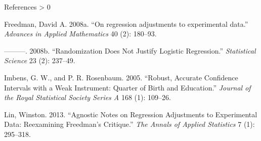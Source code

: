 \documentclass[
  ignorenonframetext,
]{beamer}
\newlength{\cslhangindent}
\newenvironment{CSLReferences}[2] %
 {%
  \setlength{\parindent}{0pt}
  \ifodd #1 \everypar{\setlength{\hangindent}{\cslhangindent}}\ignorespaces\fi
  \ifnum #2 > 0
  \setlength{\parskip}{#2\baselineskip}
  \fi
 }%
 {}
\begin{document}
\begin{frame}{References}
\protect\hypertarget{references}{}
\hypertarget{refs}{}
\begin{CSLReferences}{1}{0}
\leavevmode\hypertarget{ref-freedman2008rae}{}%
Freedman, David A. 2008a. {``{On regression adjustments to experimental
data}.''} \emph{Advances in Applied Mathematics} 40 (2): 180--93.

\leavevmode\hypertarget{ref-freedman2008randomization}{}%
---------. 2008b. {``Randomization Does Not Justify Logistic
Regression.''} \emph{Statistical Science} 23 (2): 237--49.

\leavevmode\hypertarget{ref-imbens2005robust}{}%
Imbens, G. W., and P. R. Rosenbaum. 2005. {``Robust, Accurate Confidence
Intervals with a Weak Instrument: Quarter of Birth and Education.''}
\emph{Journal of the Royal Statistical Society Series A} 168 (1):
109--26.

\leavevmode\hypertarget{ref-lin_agnostic_2013}{}%
Lin, Winston. 2013. {``Agnostic Notes on Regression Adjustments to
Experimental Data: {Reexamining} {Freedman}'s Critique.''} \emph{The
Annals of Applied Statistics} 7 (1): 295--318.

\end{CSLReferences}
\end{frame}
\end{document}
